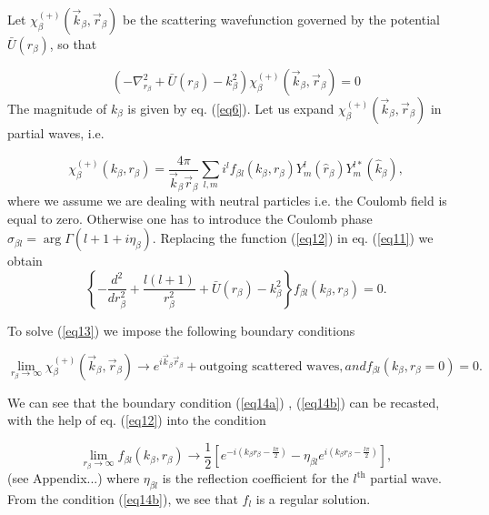 Let $\chi_\beta^{(+)}(\vec k_ \beta,\vec r_ \beta)$ be the scattering wavefunction governed by the potential $\bar U (r_ \beta)$, so that

\begin{equation}\label{eq11}
 \left(-\nabla^2_{r_ \beta}+\bar U (r_ \beta)-k_\beta^2 \right) \chi_\beta^{(+)}(\vec k_ \beta,\vec r_ \beta)=0
\end{equation}
The magnitude of $k_\beta$ is given by eq. (\ref{eq6}). Let us expand $\chi_\beta^{(+)}(\vec k_ \beta,\vec r_ \beta)$ in partial waves, i.e.

\begin{equation}\label{eq12}
\chi_\beta^{(+)}( k_ \beta, r_ \beta)=\frac{4\pi}{\vec k_ \beta \vec r_ \beta}\sum_{l,m} i^l f_{\beta l}( k_ \beta, r_ \beta) Y_m^l(\hat r_\beta)Y_m^{l*}(\hat k_\beta),
\end{equation}
where we assume we are dealing with neutral particles i.e. the Coulomb field is equal to zero. Otherwise one has to introduce the Coulomb phase $\sigma_{\beta l}=\arg \Gamma(l+1+i\eta_\beta)$.
Replacing the function (\ref{eq12}) in eq. (\ref{eq11}) we obtain
\begin{equation}\label{eq13}
\left\lbrace -\frac{d^2}{dr^2_\beta}+\frac{l(l+1)}{r^2_\beta}+\bar U (r_ \beta)-k_\beta^2\right\rbrace f_{\beta l}( k_ \beta, r_ \beta)=0.
\end{equation}

To solve (\ref{eq13}) we impose the following boundary conditions

\begin{subequations}
 \begin{equation}\label{eq14a}
\lim_{r_\beta \rightarrow \infty} \chi_\beta^{(+)}(\vec k_ \beta,\vec r_ \beta) \longrightarrow e^{i \vec k_ \beta \vec r_ \beta} +
\text{outgoing scattered waves},
\end{equation}
and
\begin{equation}\label{eq14b}
f_{\beta l}( k_ \beta, r_ \beta=0)=0.
\end{equation}

\end{subequations}

We can see that the boundary condition (\ref{eq14a}) , (\ref{eq14b}) can be recasted, with the help of eq. (\ref{eq12}) into the condition

 \begin{equation}\label{eq15}
\lim_{r_\beta \rightarrow \infty} f_{\beta l}( k_ \beta, r_ \beta) \longrightarrow
\frac{1}{2}\left[ e^{-i  (k_ \beta r_ \beta -\frac{l\pi}{2})}-\eta_{\beta l}e^{i  (k_ \beta r_ \beta -\frac{l\pi}{2})}\right],
\end{equation}
(see Appendix...)
where $\eta_{\beta l}$ is the reflection coefficient for the $l^{\text{th}}$ partial wave. From the condition (\ref{eq14b}), we see that $f_l$ is a regular solution.


